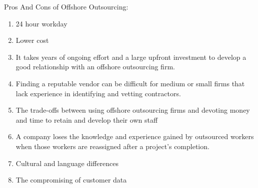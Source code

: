 \documentclass[11pt]{article}
\begin{document}
Pros And Cons of Offshore Outsourcing:
\begin{enumerate}
\item 24 hour workday
\item Lower cost
\item It takes years of ongoing effort and a large upfront investment to develop a good relationship with an offshore outsourcing firm.
\item Finding a reputable vendor can be difficult for medium or small firms that lack experience in identifying and vetting contractors.
\item The trade-offs between using offshore outsourcing firms and devoting money and time to retain and develop their own staff
\item A company loses the knowledge and experience gained by outsourced workers when those workers are reassigned after a project’s completion.
\item Cultural and language differences
\item The compromising of customer data
\end{enumerate}
\end{document}
